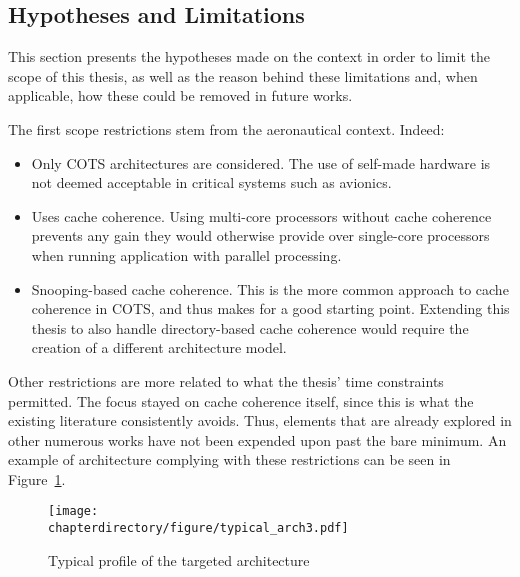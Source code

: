 \subsection{Hypotheses and Limitations}
\label{sec:thesis_hypotheses}
This section presents the hypotheses made on the context in order to limit the
scope of this thesis, as well as the reason behind these limitations and, when
applicable, how these could be removed in future works.

The first scope restrictions stem from the aeronautical context. Indeed:
\begin{itemize}
\item Only COTS architectures are considered. The use of self-made hardware is
not deemed acceptable in critical systems such as avionics.
\item Uses cache coherence. Using multi-core processors without cache coherence
prevents any gain they would otherwise provide over single-core processors when
running application with parallel processing.
\item Snooping-based cache coherence. This is the more common approach to cache
coherence in COTS, and thus makes for a good starting point. Extending this
thesis to also handle directory-based cache coherence would require the creation
of a different architecture model.
\end{itemize}

Other restrictions are more related to what the thesis' time constraints
permitted. The focus stayed on cache coherence itself, since this is what the
existing literature consistently avoids. Thus, elements that are already
explored in other numerous works have not been expended upon past the bare
minimum. An example of architecture complying with these restrictions can
be seen in Figure~\ref{fig:second_intro:typical_arch}.

\begin{figure}[hbt!]
\begin{center}
\texttt{[image: \\chapterdirectory/figure/typical\_arch3.pdf]}
\end{center}
\caption{Typical profile of the targeted architecture}
\label{fig:second_intro:typical_arch}
\end{figure}

